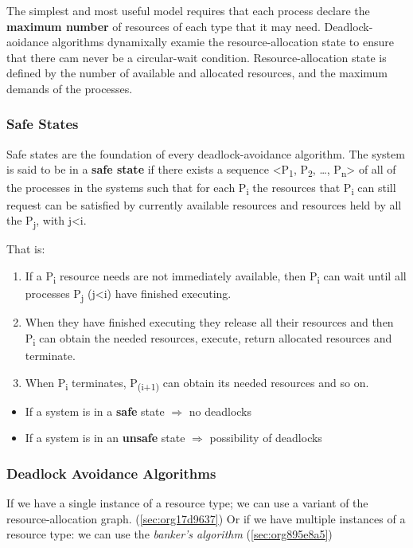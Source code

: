 \documentclass[11pt]{article}
\begin{document}
The simplest and most useful model requires that each process declare the \textbf{maximum number} of resources of each type that it may need.
Deadlock-aoidance algorithms dynamixally examie the resource-allocation state to ensure that there cam never be a circular-wait condition.
Resource-allocation state is defined by the number of available and allocated resources, and the maximum demands of the processes.

\subsubsection{Safe States}
\label{sec:orgba7a8cb}
Safe states are the foundation of every deadlock-avoidance algorithm.
The system is said to be in a \textbf{safe state} if there exists a sequence <P\textsubscript{1}, P\textsubscript{2}, \ldots{}, P\textsubscript{n}> of all of the processes in the systems such that for each P\textsubscript{i} the resources that P\textsubscript{i} can still request can be satisfied by currently available resources and resources held by all the P\textsubscript{j}, with j<i.

That is:
\begin{enumerate}
\item If a P\textsubscript{i} resource needs are not immediately available, then P\textsubscript{i} can wait until all processes P\textsubscript{j} (j<i) have finished executing.
\item When they have finished executing they release all their resources and then P\textsubscript{i} can obtain the needed resources, execute, return allocated resources and terminate.
\item When P\textsubscript{i} terminates, P\textsubscript{(i+1)} can obtain its needed resources and so on.
\end{enumerate}


\begin{itemize}
\item If a system is in a \textbf{safe} state \(\Rightarrow\) no deadlocks
\item If a system is in an \textbf{unsafe} state \(\Rightarrow\) possibility of deadlocks
\end{itemize}

\subsubsection{Deadlock Avoidance Algorithms}
\label{sec:org2e58b47}
If we have a single instance of a resource type; we can use a variant of the resource-allocation graph. (\ref{sec:org17d9637})
Or if we have multiple instances of a resource type: we can use the \emph{banker's algorithm} (\ref{sec:org895e8a5})
\end{document}
